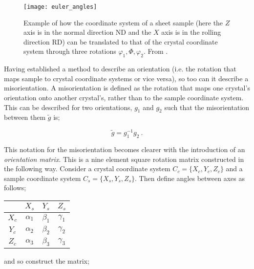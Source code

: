 \documentclass[a4paper,12pt,twoside]{report}
\numberwithin{equation}{chapter}
\begin{document}
\begin{figure}[h!]
  \centering
    \texttt{[image: euler\_angles]}
  \caption[Euler angle description]{Example of how the coordinate system of a sheet sample (here the $Z$ axis is in the normal direction ND and the $X$ axis is in the rolling direction RD) can be translated to that of the crystal coordinate system through three rotations $\varphi_1,\Phi,\varphi_2$. From \cite{Randle2000}.}
  \label{fig:euler_angles}
\end{figure}

Having established a method to describe an orientation (i.e. the rotation that maps sample to crystal coordinate systems or vice versa), so too can it describe a misorientation. A misorientation is defined as the rotation that maps one crystal's orientation onto another crystal's, rather than to the sample coordinate system. This can be described for two orientations, $g_1$ and $g_2$ such that the misorientation between them $\tilde{g}$ is;

\begin{equation} \label{eq:misor_matrix}
\tilde{g} = g_1^{-1}g_2\ .
\end{equation} 

This notation for the misorientation becomes clearer with the introduction of an \emph{orientation matrix}. This is a nine element square rotation matrix constructed in the following way. Consider a crystal coordinate system $C_c = \{X_c,Y_c,Z_c\}$ and a sample coordinate system $C_s = \{X_s,Y_s,Z_s\}$. Then define angles between axes as follows;

\begin{table}[h!]
    \centering
	\begin{tabular}{c | c c c}

	  & $X_s$      & $Y_s$      & $Z_s$ \\
\hline
$X_c$ & $\alpha_1$ & $\beta_1$ & $\gamma_1$ \\
$Y_c$ & $\alpha_2$ & $\beta_2$ & $\gamma_2$ \\
$Z_c$ & $\alpha_3$ & $\beta_3$ & $\gamma_3$ \\

	\end{tabular}
\end{table}
\noindent
and so construct the matrix;
\end{document}
